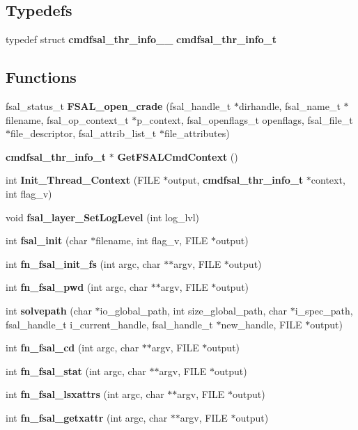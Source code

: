 \subsection*{Typedefs}
\begin{CompactItemize}
\item 
typedef struct {\bf cmdfsal\_\-thr\_\-info\_\-\_\-} {\bf cmdfsal\_\-thr\_\-info\_\-t}
\end{CompactItemize}
\subsection*{Functions}
\begin{CompactItemize}
\item 
fsal\_\-status\_\-t {\bf FSAL\_\-open\_\-crade} (fsal\_\-handle\_\-t $\ast$dirhandle, fsal\_\-name\_\-t $\ast$filename, fsal\_\-op\_\-context\_\-t $\ast$p\_\-context, fsal\_\-openflags\_\-t openflags, fsal\_\-file\_\-t $\ast$file\_\-descriptor, fsal\_\-attrib\_\-list\_\-t $\ast$file\_\-attributes)
\item 
{\bf cmdfsal\_\-thr\_\-info\_\-t} $\ast$ {\bf GetFSALCmdContext} ()
\item 
int {\bf Init\_\-Thread\_\-Context} (FILE $\ast$output, {\bf cmdfsal\_\-thr\_\-info\_\-t} $\ast$context, int flag\_\-v)
\item 
void {\bf fsal\_\-layer\_\-SetLogLevel} (int log\_\-lvl)
\item 
int {\bf fsal\_\-init} (char $\ast$filename, int flag\_\-v, FILE $\ast$output)
\item 
int {\bf fn\_\-fsal\_\-init\_\-fs} (int argc, char $\ast$$\ast$argv, FILE $\ast$output)
\item 
int {\bf fn\_\-fsal\_\-pwd} (int argc, char $\ast$$\ast$argv, FILE $\ast$output)
\item 
int {\bf solvepath} (char $\ast$io\_\-global\_\-path, int size\_\-global\_\-path, char $\ast$i\_\-spec\_\-path, fsal\_\-handle\_\-t i\_\-current\_\-handle, fsal\_\-handle\_\-t $\ast$new\_\-handle, FILE $\ast$output)
\item 
int {\bf fn\_\-fsal\_\-cd} (int argc, char $\ast$$\ast$argv, FILE $\ast$output)
\item 
int {\bf fn\_\-fsal\_\-stat} (int argc, char $\ast$$\ast$argv, FILE $\ast$output)
\item 
int {\bf fn\_\-fsal\_\-lsxattrs} (int argc, char $\ast$$\ast$argv, FILE $\ast$output)
\item 
int {\bf fn\_\-fsal\_\-getxattr} (int argc, char $\ast$$\ast$argv, FILE $\ast$output)
\item 

\end{CompactItemize}
